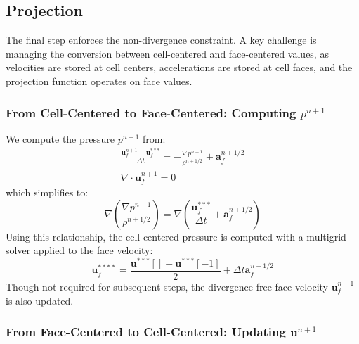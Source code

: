 \documentclass[a4paper]{article}
\begin{document}
\subsection{Projection}

The final step enforces the non-divergence constraint. A key challenge is managing the conversion between cell-centered and face-centered values, as velocities are stored at cell centers, accelerations are stored at cell faces, and the projection function operates on face values.  

\subsubsection{From Cell-Centered to Face-Centered: Computing $p^{n+1}$}  

We compute the pressure $p^{n+1}$ from:  
\begin{gather}
    \frac{\mathbf{u}_f^{n+1} - \mathbf{u}_f^{***}}{\Delta t}
  = -\frac{\nabla p^{n+1}}{\rho^{n+1/2}} + \mathbf{a}_f^{n+1/2}\\
    \nabla\cdot\mathbf{u}_f^{n+1} = 0
\end{gather}  
which simplifies to:  
\begin{equation}
    \nabla\left(\frac{\nabla p^{n+1}}{\rho^{n+1/2}}\right) = \nabla\left(\frac{\mathbf{u}_f^{***}}{\Delta t} + \mathbf{a}_f^{n+1/2}\right)
\end{equation}  
Using this relationship, the cell-centered pressure is computed with a multigrid solver applied to the face velocity:  
\begin{equation}
    \mathbf{u}_f^{****} = \frac{\mathbf{u}^{***}[] + \mathbf{u}^{***}[-1]}{2}
  + \Delta t \mathbf{a}_f^{n+1/2}
\end{equation}  
Though not required for subsequent steps, the divergence-free face velocity $\mathbf{u}_f^{n+1}$ is also updated.  

\subsubsection{From Face-Centered to Cell-Centered: Updating $\mathbf{u}^{n+1}$}  
\end{document}
